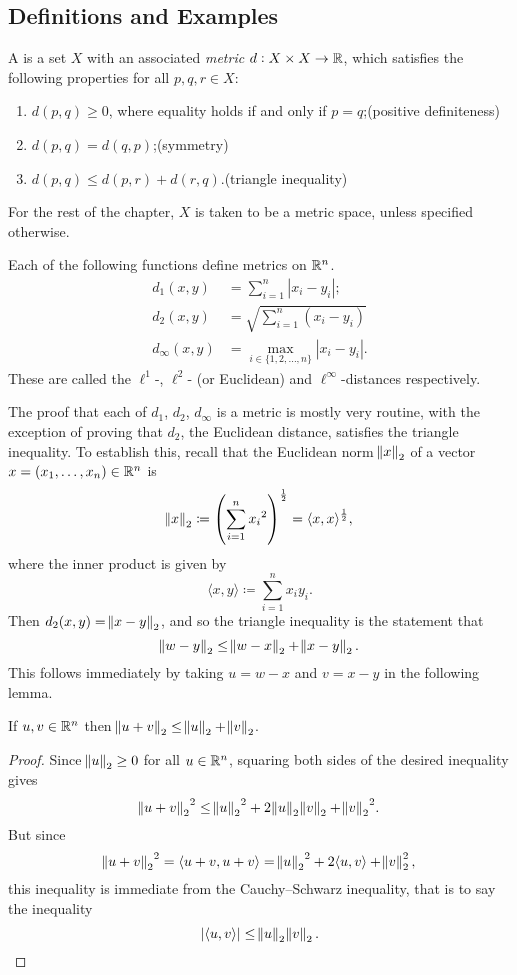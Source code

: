 \subsection{Definitions and Examples}
\begin{definition}
A  is a set $X$ with an associated \emph{metric} $d:X\times X\to\mathbb R$, which satisfies the following properties for all $p,q,r\in X$:
\begin{enumerate}[label=(\roman*)]
\item $d(p,q)\ge0$, where equality holds if and only if $p=q$;\hfill(positive definiteness)
\item $d(p,q)=d(q,p)$;\hfill(symmetry)
\item $d(p,q)\le d(p,r)+d(r,q)$.\hfill(triangle inequality)
\end{enumerate}
\end{definition}

For the rest of the chapter, $X$ is taken to be a metric space, unless specified otherwise.

\begin{example}[Metrics on $\RR^n$]
Each of the following functions define metrics on $\RR^n$.
\begin{align*}
d_1(x,y)&=\sum_{i=1}^{n}|x_i-y_i|;\\
d_2(x,y)&=\sqrt{\sum_{i=1}^{n}(x_i-y_i)}\\
d_\infty(x,y)&=\max_{i\in\{1,2,\dots,n\}}|x_i-y_i|.
\end{align*}
These are called the $\ell^1$-, $\ell^2$- (or Euclidean) and $\ell^\infty$-distances respectively.

The proof that each of $d_1$, $d_2$, $d_\infty$ is a metric is mostly very routine, with the exception of proving that $d_2$, the Euclidean distance, satisfies the triangle inequality. To establish this, recall that the Euclidean norm $\norm{x}_2$ of a vector $x=(x_1,\dots,x_n)\in\mathbb R^n$ is
\[\norm{x}_2\coloneqq\left(\sum_{i=1}^n{x_i}^2\right)^\frac{1}{2}=\langle x,x\rangle^\frac{1}{2},\]
where the inner product is given by
\[\langle x,y\rangle\coloneqq\sum_{i=1}^{n}x_i y_i.\]
Then $d_2(x,y)=\norm{x-y}_2$, and so the triangle inequality is the statement that
\[\norm{w-y}_2\le\norm{w-x}_2+\norm{x-y}_2.\]
This follows immediately by taking $u=w-x$ and $v=x-y$ in the following lemma.

\begin{lemma*}
If $u,v\in\mathbb R^n$ then $\norm{u+v}_2\le\norm{u}_2+\norm{v}_2$.
\end{lemma*}

\begin{proof}
Since $\norm{u}_2\ge0$ for all $u\in\mathbb R^n$, squaring both sides of the desired inequality gives
\[{\norm{u+v}_2}^2\le{\norm{u}_2}^2+2\norm{u}_2\norm{v}_2+{\norm{v}_2}^2.\]
But since
\[{\norm{u+v}_2}^2=\langle u+v,u+v\rangle={\norm{u}_2}^2+2\langle u,v\rangle+\norm{v}_2^2,\]
this inequality is immediate from the Cauchy--Schwarz inequality, that is to say the inequality
\[|\langle u,v\rangle|\le\norm{u}_2\norm{v}_2.\]
\end{proof}
\end{example}


